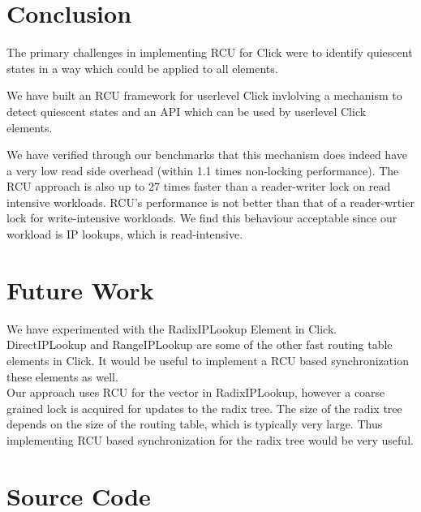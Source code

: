 \documentclass[a4paper]{article}
\begin{document}
\section{Conclusion}

The primary challenges in implementing RCU for Click were to
identify quiescent states in a way which could be applied to all
elements. 

We have built an RCU framework for userlevel Click invlolving a
mechanism to detect quiescent states and an API which can be used by userlevel Click elements.

We have verified through our benchmarks that this mechanism does
indeed have a very low read side overhead (within 1.1 times
non-locking performance). The RCU approach is also up to 27 times
faster than a reader-writer lock on read intensive workloads. RCU's performance is not better than that of a reader-wrtier lock for
write-intensive workloads. We find this behaviour acceptable since our
workload is IP lookups, which is read-intensive. 
\section{Future Work}

We have experimented with the RadixIPLookup Element in Click. DirectIPLookup and RangeIPLookup are some of the other fast routing table elements in Click. It would be useful to implement a RCU based synchronization these elements as well.\\ 

Our approach uses RCU for the vector in RadixIPLookup, however a coarse grained lock is acquired for updates to the radix tree. The size of the radix tree depends on the size of the routing table, which is typically very large. Thus implementing RCU based synchronization for the radix tree would be very useful.

\appendix
\section{Source Code}
\label{sec:source}
\end{document}

